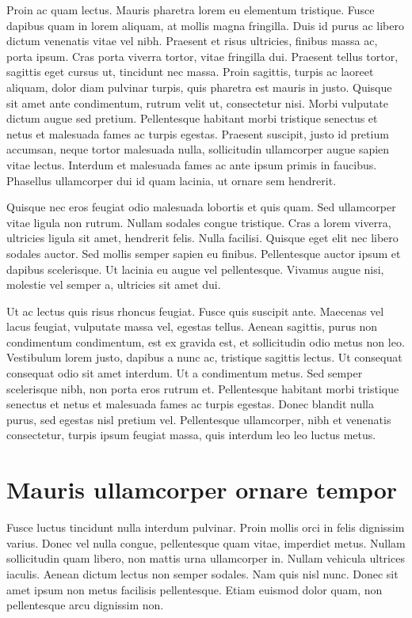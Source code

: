Proin ac quam lectus. Mauris pharetra lorem eu elementum tristique. Fusce dapibus quam in lorem aliquam, at mollis magna fringilla. Duis id purus ac libero dictum venenatis vitae vel nibh. Praesent et risus ultricies, finibus massa ac, porta ipsum. Cras porta viverra tortor, vitae fringilla dui. Praesent tellus tortor, sagittis eget cursus ut, tincidunt nec massa. Proin sagittis, turpis ac laoreet aliquam, dolor diam pulvinar turpis, quis pharetra est mauris in justo. Quisque sit amet ante condimentum, rutrum velit ut, consectetur nisi. Morbi vulputate dictum augue sed pretium. Pellentesque habitant morbi tristique senectus et netus et malesuada fames ac turpis egestas. Praesent suscipit, justo id pretium accumsan, neque tortor malesuada nulla, sollicitudin ullamcorper augue sapien vitae lectus. Interdum et malesuada fames ac ante ipsum primis in faucibus. Phasellus ullamcorper dui id quam lacinia, ut ornare sem hendrerit.

Quisque nec eros feugiat odio malesuada lobortis et quis quam. Sed ullamcorper vitae ligula non rutrum. Nullam sodales congue tristique. Cras a lorem viverra, ultricies ligula sit amet, hendrerit felis. Nulla facilisi. Quisque eget elit nec libero sodales auctor. Sed mollis semper sapien eu finibus. Pellentesque auctor ipsum et dapibus scelerisque. Ut lacinia eu augue vel pellentesque. Vivamus augue nisi, molestie vel semper a, ultricies sit amet dui.

Ut ac lectus quis risus rhoncus feugiat. Fusce quis suscipit ante. Maecenas vel lacus feugiat, vulputate massa vel, egestas tellus. Aenean sagittis, purus non condimentum condimentum, est ex gravida est, et sollicitudin odio metus non leo. Vestibulum lorem justo, dapibus a nunc ac, tristique sagittis lectus. Ut consequat consequat odio sit amet interdum. Ut a condimentum metus. Sed semper scelerisque nibh, non porta eros rutrum et. Pellentesque habitant morbi tristique senectus et netus et malesuada fames ac turpis egestas. Donec blandit nulla purus, sed egestas nisl pretium vel. Pellentesque ullamcorper, nibh et venenatis consectetur, turpis ipsum feugiat massa, quis interdum leo leo luctus metus.

\section{Mauris ullamcorper ornare tempor}
Fusce luctus tincidunt nulla interdum pulvinar. Proin mollis orci in felis dignissim varius. Donec vel nulla congue, pellentesque quam vitae, imperdiet metus. Nullam sollicitudin quam libero, non mattis urna ullamcorper in. Nullam vehicula ultrices iaculis. Aenean dictum lectus non semper sodales. Nam quis nisl nunc. Donec sit amet ipsum non metus facilisis pellentesque. Etiam euismod dolor quam, non pellentesque arcu dignissim non.

